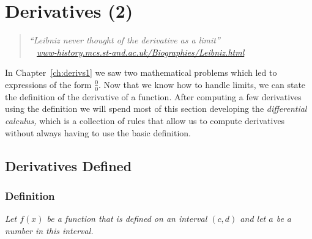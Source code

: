 




\chapter{Derivatives (2)}




\begin{quote}\itshape
    ``Leibniz never thought of the derivative as a limit''\\[1ex]
  \footnotesize~\hfill
  \href{http://www-history.mcs.st-and.ac.uk/Biographies/Leibniz.html}
  {www-history.mcs.st-and.ac.uk/Biographies/Leibniz.html}\\
\end{quote}




\medskip




\noindent
In Chapter~\ref{ch:derivs1} we saw two mathematical problems which led
to expressions of the form $\frac00$.  Now that we know how to handle
limits, we can state the definition of the derivative of a function.
\marginpar{\footnotesize\sffamily%
  \\
  \\
  \\
   }%
After computing a few derivatives using the definition we will spend
most of this section developing the \textit{differential calculus,}
which is a collection of rules that allow us to compute derivatives
without always having to use the basic definition.




\section{Derivatives Defined} 
%
\subsection{Definition} 
\label{def:derivative}\itshape
Let $f(x)$ be a function that is defined on an interval $(c, d)$
and let $a$ be a number in this interval.




